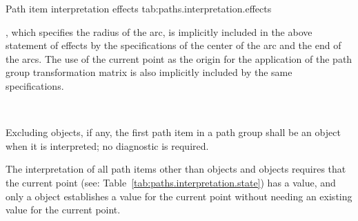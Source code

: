 \begin{libreqtab2a} {Path item interpretation effects} {tab:paths.interpretation.effects}
\begin{note} , which specifies the radius of the arc, is implicitly included in the above statement of effects by the specifications of the center of the arc and the end of the arcs. The use of the current point as the origin for the application of the path group transformation matrix is also implicitly included by the same specifications. \end{note} \\
\end{libreqtab2a}

\pnum
Excluding  objects, if any, the first path item in a path group shall be an  object when it is interpreted; no diagnostic is required.

\pnum
\begin{note}
The interpretation of all path items other than  objects and  objects requires that the current point (see: Table~\ref{tab:paths.interpretation.state}) has a value, and only a  object establishes a value for the current point without needing an existing value for the current point.
\end{note}
